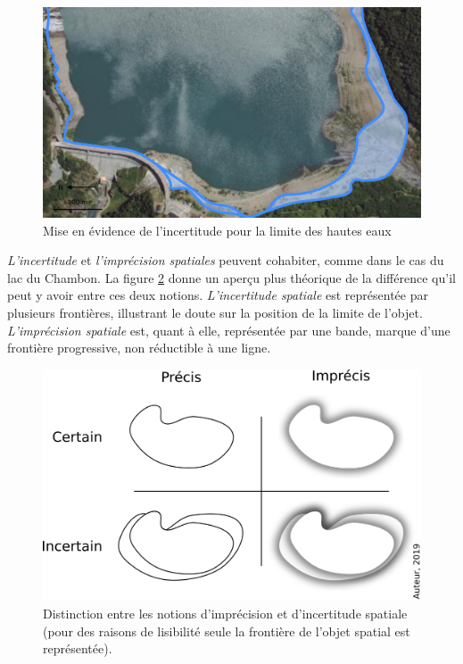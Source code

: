 \begin{figure}
  \centering
  \includegraphics{../figures/fig4.png}
  \caption{Mise en évidence de l'incertitude pour la limite des hautes
    eaux}
  \label{fig:lim_champ_inc}
\end{figure}

\emph{L’incertitude} et \emph{l’imprécision spatiales} peuvent
cohabiter, comme dans le cas du lac du Chambon. La figure
\ref{fig:inc_vs_imp} donne un aperçu plus théorique de la différence
qu’il peut y avoir entre ces deux notions. \emph{L’incertitude
  spatiale} est représentée par plusieurs frontières, illustrant le
doute sur la position de la limite de l’objet. \emph{L’imprécision
  spatiale} est, quant à elle, représentée par une bande, marque d’une
frontière progressive, non réductible à une ligne.

\begin{figure}
  \centering
  \includegraphics{../figures/fig5.png}
  \caption{Distinction entre les notions d’imprécision et
    d'incertitude spatiale (pour des raisons de lisibilité seule la
    frontière de l’objet spatial est représentée).}
  \label{fig:inc_vs_imp}
\end{figure}

